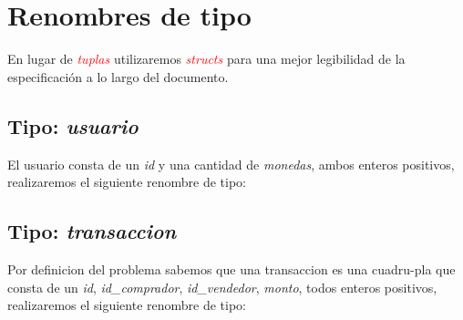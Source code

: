 \documentclass[10pt,a4paper]{article}
\begin{document}
    \maketitle

    \section{Renombres de tipo}
    En lugar de \textcolor{red}{\textit{tuplas}} utilizaremos \textcolor{red}{\textit{structs}} para una mejor legibilidad de la especificación a lo largo del documento.

    \subsection{Tipo: \textit{usuario}}
    El usuario consta de un \textit{id} y una cantidad de \textit{monedas}, ambos enteros positivos, realizaremos el siguiente renombre de tipo:

    \vspace{0.3cm}
    \noindent
    \vspace{0.1cm}

    \subsection{Tipo: \textit{transaccion}}
    Por definicion del problema sabemos que una transaccion es una cuadru-pla que consta de un \textit{id}, \textit{id\_comprador}, \textit{id\_vendedor}, \textit{monto}, todos enteros positivos, realizaremos el siguiente renombre de tipo:

    \vspace{0.3cm}
    \noindent
    \vspace{0.1cm}
\end{document}
